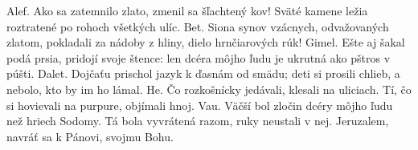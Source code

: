 Alef.
Ako sa zatemnilo zlato,
zmenil sa šľachtený kov!
Sväté kamene ležia roztratené
po rohoch všetkých ulíc.
\versseparator
Bet.
Siona synov vzácnych,
odvažovaných zlatom,
pokladali za nádoby z hliny,
dielo hrnčiarových rúk!
\versseparator
Gimel.
Ešte aj šakal podá prsia,
pridojí svoje štence:
len dcéra môjho ľudu je ukrutná
ako pštros v púšti.
\versseparator
Dalet.
Dojčaťu prischol jazyk
k ďasnám od smädu;
deti si prosili chlieb,
a nebolo, kto by im ho lámal.
\versseparator
He.
Čo rozkošnícky jedávali,
klesali na uliciach.
Tí, čo si hovievali na purpure,
objímali hnoj.
\versseparator
Vau.
Väčší bol zločin dcéry môjho ľudu
než hriech Sodomy.
Tá bola vyvrátená razom,
ruky neustali v nej.
\versseparator
Jeruzalem, navráť sa k Pánovi, svojmu Bohu.